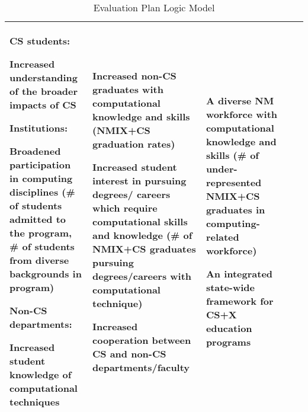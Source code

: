 \begin{table}[htb!]
\begin{tabular}{|p{1in}|p{1.35in}|p{1.2in}|p{1in}|p{1in}|}
    \vspace{0.1in}
    \textbf{CS students:}
    
    Increased understanding of the broader impacts of CS

    \vspace{0.1in}
    \textbf{Institutions:}
    
    Broadened participation in computing disciplines (\# of students admitted to the program, \# of students from diverse backgrounds in program)
       
    \vspace{0.1in}
    \textbf{Non-CS departments:}
    
    Increased student knowledge of computational techniques 
    & 
    Increased non-CS graduates with computational knowledge and skills (NMIX+CS graduation rates) 
 
 \vspace{0.1in}
     Increased student interest in pursuing degrees/ careers which require computational skills and knowledge (\# of NMIX+CS graduates pursuing degrees/careers with computational technique) 

    \vspace{0.1in}
    Increased cooperation between CS and non-CS departments/faculty

    & 
    
    A diverse NM workforce with computational knowledge and skills (\# of under-represented NMIX+CS graduates in computing-related workforce)
    
    \vspace{0.1in}
    An integrated state-wide framework for
CS+X education programs 

    \\
    
\hline
\end{tabular}
\caption{Evaluation Plan Logic Model}
\label{tab:logic-model}
\end{table}

